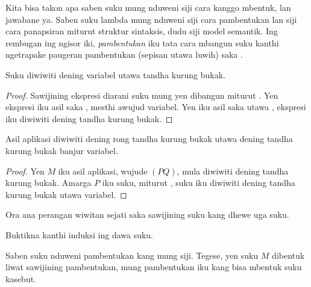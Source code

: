 \documentclass[../../../include/open-logic-section]{subfiles}
\begin{document}

Kita bisa takon apa saben suku mung nduweni
siji cara kanggo mbentuk, lan jawabane ya.
Saben suku lambda mung nduweni siji cara
pambentukan lan siji cara panapsiran miturut struktur sintaksis, dudu siji model semantik.
Ing rembugan ing ngisor iki,
\emph{pambentukan} iku tata cara mbangun
suku kanthi ngetrapake paugeran pambentukan
(sepisan utawa luwih) saka
.

\begin{lem}
Suku diwiwiti dening variabel utawa
tandha kurung bukak.
\end{lem}

\begin{proof}
Sawijining ekspresi diarani suku mung yen
dibangun miturut .
Yen ekspresi iku asil saka
, mesthi
awujud variabel. Yen iku asil saka
 utawa
, ekspresi
iku diwiwiti dening tandha kurung bukak.
\end{proof}

\begin{lem}
Asil aplikasi diwiwiti dening rong
tandha kurung bukak utawa dening
tandha kurung bukak banjur variabel.
\end{lem}

\begin{proof}
Yen $M$ iku asil aplikasi, wujude
$(PQ)$, mula diwiwiti dening tandha
kurung bukak. Amarga $P$ iku suku,
miturut ,
suku iku diwiwiti dening tandha kurung
bukak utawa variabel.
\end{proof}

\begin{lem}
Ora ana perangan wiwitan sejati
saka sawijining suku kang dhewe
uga suku.
\end{lem}

\begin{prob}
Buktikna 
kanthi induksi ing dawa suku.
\end{prob}

\begin{prop} 
Saben suku nduweni pambentukan kang
mung siji. Tegese, yen suku $M$
dibentuk liwat sawijining pambentukan,
mung pambentukan iku kang bisa
mbentuk suku kasebut.
\end{prop}
\end{document}
